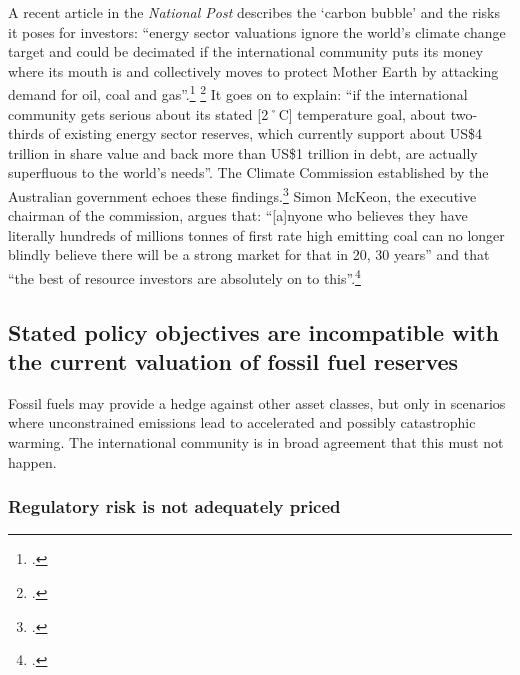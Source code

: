 \documentclass[10pt]{article}
\begin{document}
A recent article in the \emph{National Post} describes the `carbon bubble' and the risks it poses for investors: ``energy sector valuations ignore the world's climate change target and could be decimated if the international community puts its money where its mouth is and collectively moves to protect Mother Earth by attacking demand for oil, coal and gas''.\footcite[][]{OilGiantsMajorPain} \footcite[See also: ][]{TimelyIssue}
It goes on to explain: ``if the international community gets serious about its stated [2˚C] temperature goal, about two-thirds of existing energy sector reserves, which currently support about US\$4 trillion in share value and back more than US\$1 trillion in debt, are actually superfluous to the world's needs''.
The Climate Commission established by the Australian government echoes these findings.\footcite[][]{CriticalDecade2013}
Simon McKeon, the executive chairman of the commission, argues that: ``[a]nyone who believes they have literally hundreds of millions tonnes of first rate high emitting  coal can no longer blindly believe there will be a strong market for that in 20, 30 years'' and that ``the best of resource investors are absolutely on to this''.\footcite[][]{CoalWillBeLeft}



	\subsection {Stated policy objectives are incompatible with the current valuation of fossil fuel reserves}



Fossil fuels may provide a hedge against other asset classes, but only in scenarios where unconstrained emissions lead to accelerated and possibly catastrophic warming. 
The international community is in broad agreement that this must not happen.



	\subsubsection {Regulatory risk is not adequately priced} 
\end{document}
